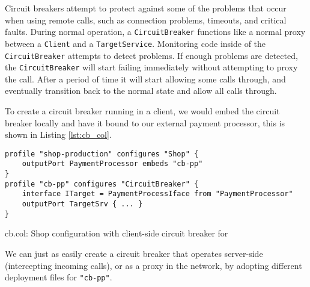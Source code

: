 Circuit breakers attempt to protect against some of the problems that occur
when using remote calls, such as connection problems, timeouts, and critical
faults.
%
During normal operation, a \lstinline|CircuitBreaker| functions like a normal
proxy between a \lstinline|Client| and a \lstinline|TargetService|.  Monitoring
code inside of the \lstinline|CircuitBreaker| attempts to detect problems. If
enough problems are detected, the \lstinline|CircuitBreaker| will start failing
immediately without attempting to proxy the call. After a period of time it
will start allowing some calls through, and eventually transition back to the
normal state and allow all calls through.

To create a circuit breaker running in a client, we would embed the circuit
breaker locally and have it bound to our external payment processor, this is
shown in Listing \ref{lst:cb_col}.

\begin{listing}[H]
\begin{verbatim}
profile "shop-production" configures "Shop" {
    outputPort PaymentProcessor embeds "cb-pp"
}
profile "cb-pp" configures "CircuitBreaker" {
    interface ITarget = PaymentProcessIface from "PaymentProcessor"
    outputPort TargetSrv { ... }
}
\end{verbatim}

\caption{cb.col: Shop configuration with client-side circuit breaker for
    }

\label{lst:cb_col}

\end{listing}

We can just as easily create a circuit breaker that operates server-side
(intercepting incoming calls), or as a proxy in the network, by adopting
different deployment files for \lstinline|"cb-pp"|.
